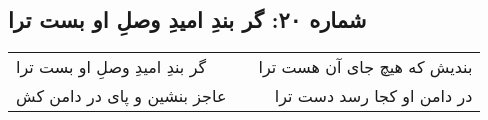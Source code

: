 \begin{center}
\section*{شماره ۲۰: گر بندِ امیدِ وصلِ او بست ترا}
\label{sec:020}
\begin{longtable}{l p{0.5cm} r}
گر بندِ امیدِ وصلِ او بست ترا
&&
بندیش که هیچ جای آن هست ترا
\\
عاجز بنشین و پای در دامن کش
&&
در دامن او کجا رسد دست ترا
\\
\end{longtable}
\end{center}
